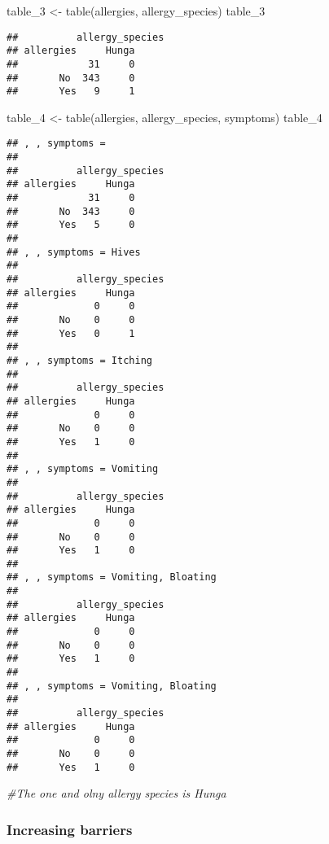 \documentclass[
]{article}
\newenvironment{Shaded}{\begin{snugshade}}{\end{snugshade}}
\newcommand{\CommentTok}[1]{\textcolor[rgb]{0.56,0.35,0.01}{\textit{#1}}}
\newcommand{\FunctionTok}[1]{\textcolor[rgb]{0.00,0.00,0.00}{#1}}
\newcommand{\NormalTok}[1]{#1}
\newcommand{\OtherTok}[1]{\textcolor[rgb]{0.56,0.35,0.01}{#1}}
\begin{document}
\begin{Shaded}
\begin{Highlighting}[]
\NormalTok{table\_3 }\OtherTok{\textless{}{-}} \FunctionTok{table}\NormalTok{(allergies, allergy\_species)}
\NormalTok{table\_3}
\end{Highlighting}
\end{Shaded}

\begin{verbatim}
##          allergy_species
## allergies     Hunga
##            31     0
##       No  343     0
##       Yes   9     1
\end{verbatim}

\begin{Shaded}
\begin{Highlighting}[]
\NormalTok{table\_4 }\OtherTok{\textless{}{-}} \FunctionTok{table}\NormalTok{(allergies, allergy\_species, symptoms)}
\NormalTok{table\_4}
\end{Highlighting}
\end{Shaded}

\begin{verbatim}
## , , symptoms = 
## 
##          allergy_species
## allergies     Hunga
##            31     0
##       No  343     0
##       Yes   5     0
## 
## , , symptoms = Hives
## 
##          allergy_species
## allergies     Hunga
##             0     0
##       No    0     0
##       Yes   0     1
## 
## , , symptoms = Itching
## 
##          allergy_species
## allergies     Hunga
##             0     0
##       No    0     0
##       Yes   1     0
## 
## , , symptoms = Vomiting
## 
##          allergy_species
## allergies     Hunga
##             0     0
##       No    0     0
##       Yes   1     0
## 
## , , symptoms = Vomiting, Bloating
## 
##          allergy_species
## allergies     Hunga
##             0     0
##       No    0     0
##       Yes   1     0
## 
## , , symptoms = Vomiting, Bloating 
## 
##          allergy_species
## allergies     Hunga
##             0     0
##       No    0     0
##       Yes   1     0
\end{verbatim}

\begin{Shaded}
\begin{Highlighting}[]
\CommentTok{\#The one and olny allergy species is Hunga}
\end{Highlighting}
\end{Shaded}

\hypertarget{increasing-barriers}{%
\subsubsection{Increasing barriers}\label{increasing-barriers}}
\end{document}
